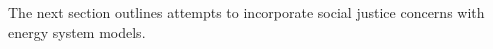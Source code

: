 
The next section outlines attempts to incorporate social justice concerns with energy
system models.